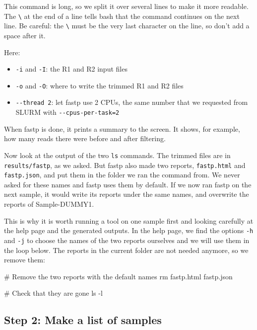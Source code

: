 \documentclass[
  letterpaper,
  DIV=11,
  numbers=noendperiod]{scrreprt}
\newenvironment{Shaded}{}{}
\newcommand{\AttributeTok}[1]{\textcolor[rgb]{0.84,0.23,0.29}{#1}}
\newcommand{\CommentTok}[1]{\textcolor[rgb]{0.42,0.45,0.49}{#1}}
\newcommand{\FunctionTok}[1]{\textcolor[rgb]{0.44,0.26,0.76}{#1}}
\newcommand{\NormalTok}[1]{\textcolor[rgb]{0.14,0.16,0.18}{#1}}
\providecommand{\tightlist}{%
  \setlength{\itemsep}{0pt}\setlength{\parskip}{0pt}}
\begin{document}
This command is long, so we split it over several lines to make it more
readable. The \texttt{\textbackslash{}} at the end of a line tells bash
that the command continues on the next line. Be careful: the
\texttt{\textbackslash{}} must be the very last character on the line,
so don't add a space after it.

Here:

\begin{itemize}
\tightlist
\item
  \texttt{-i} and \texttt{-I}: the R1 and R2 input files
\item
  \texttt{-o} and \texttt{-O}: where to write the trimmed R1 and R2
  files
\item
  \texttt{-\/-thread\ 2}: let fastp use 2 CPUs, the same number that we
  requested from SLURM with \texttt{-\/-cpus-per-task=2}
\end{itemize}

When fastp is done, it prints a summary to the screen. It shows, for
example, how many reads there were before and after filtering.

Now look at the output of the two \texttt{ls} commands. The trimmed
files are in \texttt{results/fastp}, as we asked. But fastp also made
two reports, \texttt{fastp.html} and \texttt{fastp.json}, and put them
in the folder we ran the command from. We never asked for these names
and fastp uses them by default. If we now ran fastp on the next sample,
it would write its reports under the same names, and overwrite the
reports of Sample-DUMMY1.

This is why it is worth running a tool on one sample first and looking
carefully at the help page and the generated outputs. In the help page,
we find the options \texttt{-h} and \texttt{-j} to choose the names of
the two reports ourselves and we will use them in the loop below. The
reports in the current folder are not needed anymore, so we remove them:

\begin{Shaded}
\begin{Highlighting}[]
\CommentTok{\# Remove the two reports with the default names}
\FunctionTok{rm}\NormalTok{ fastp.html fastp.json}

\CommentTok{\# Check that they are gone}
\FunctionTok{ls} \AttributeTok{{-}l}
\end{Highlighting}
\end{Shaded}

\subsection{Step 2: Make a list of
samples}\label{step-2-make-a-list-of-samples}
\end{document}

